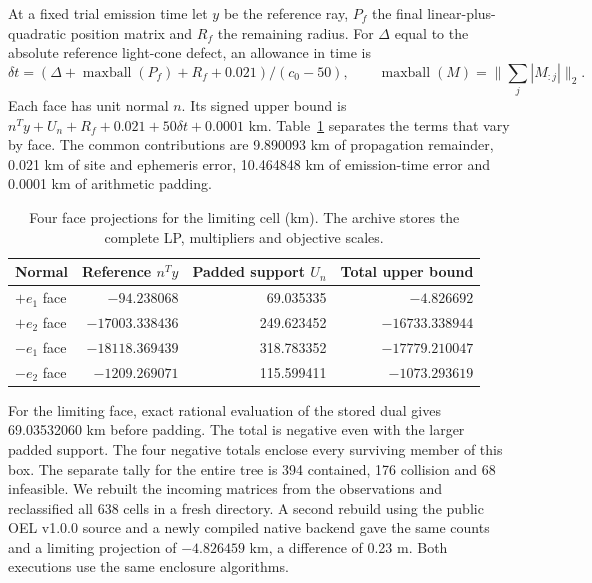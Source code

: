 \documentclass[10pt,letterpaper]{article}
\begin{document}
At a fixed trial emission time let $y$ be the reference ray, $P_f$ the final linear-plus-quadratic position matrix and $R_f$ the remaining radius. For $\Delta$ equal to the absolute reference light-cone defect, an allowance in time is
\[
 \delta t=(\Delta+\operatorname{maxball}(P_f)+R_f+0.021)/(c_0-50),
 \qquad \operatorname{maxball}(M)=\big\|\textstyle\sum_j |M_{:j}|\big\|_2 .
\]
Each face has unit normal $n$. Its signed upper bound is $n^Ty+U_n+R_f+0.021+50\delta t+0.0001$ km. Table~\ref{tab:faces} separates the terms that vary by face. The common contributions are 9.890093 km of propagation remainder, 0.021 km of site and ephemeris error, 10.464848 km of emission-time error and 0.0001 km of arithmetic padding.
\begin{table}[h]
\centering
\caption{Four face projections for the limiting cell (km). The archive stores the complete LP, multipliers and objective scales.}\label{tab:faces}
\begin{tabular}{lrrr}\toprule
Normal & Reference $n^Ty$ & Padded support $U_n$ & Total upper bound\\ \midrule
$+e_1$ face & $-94.238068$ & 69.035335 & $-4.826692$\\
$+e_2$ face & $-17003.338436$ & 249.623452 & $-16733.338944$\\
$-e_1$ face & $-18118.369439$ & 318.783352 & $-17779.210047$\\
$-e_2$ face & $-1209.269071$ & 115.599411 & $-1073.293619$\\ \bottomrule
\end{tabular}
\end{table}

For the limiting face, exact rational evaluation of the stored dual gives 69.03532060 km before padding. The total is negative even with the larger padded support. The four negative totals enclose every surviving member of this box. The separate tally for the entire tree is 394 contained, 176 collision and 68 infeasible. We rebuilt the incoming matrices from the observations and reclassified all 638 cells in a fresh directory. A second rebuild using the public OEL v1.0.0 source and a newly compiled native backend gave the same counts and a limiting projection of $-4.826459$ km, a difference of 0.23 m. Both executions use the same enclosure algorithms.
\end{document}
